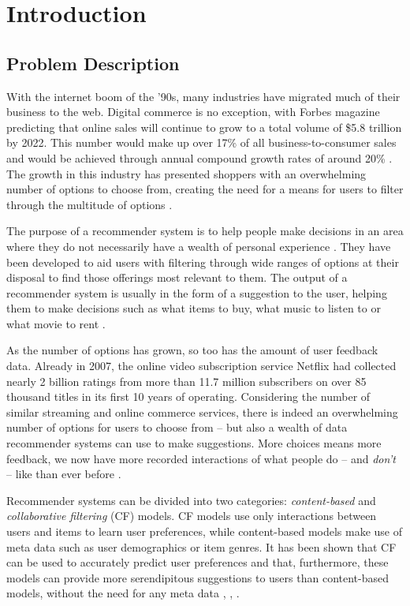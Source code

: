 \chapter{Introduction}

\label{intro} %

\section{Problem Description}
With the internet boom of the '90s, many industries have migrated much of their business to the web. Digital commerce is no exception, with Forbes magazine predicting that online sales will continue to grow to a total volume of \$5.8 trillion by 2022. This number would make up over 17\% of all business-to-consumer sales and would be achieved through annual compound growth rates of around 20\% \parencite{forbes2018growth}. The growth in this industry has presented shoppers with an overwhelming number of options to choose from, creating the need for a means for users to filter through the multitude of options \parencite{handbook_1.1_intro}.

The purpose of a  recommender system is to help people make decisions in an area where they do not necessarily have a wealth of personal experience \parencite{rs_1.1_Resnick}. They have been developed to aid users with filtering through wide ranges of options at their disposal to find those offerings most relevant to them. The output of a recommender system is usually in the form of a suggestion to the user, helping them to make decisions such as what items to buy, what music to listen to or what movie to rent \parencite{handbook_1.1_intro}.

As the number of options has grown, so too has the amount of user feedback data. Already in 2007, the online video subscription service Netflix had collected nearly 2 billion ratings from more than 11.7 million subscribers on over 85 thousand titles in its first 10 years of operating. Considering the number of similar streaming and online commerce services, there is indeed an overwhelming number of options for users to choose from -- but also a wealth of data recommender systems can use to make suggestions.
More choices means more feedback, we now have more recorded interactions of what people do -- and \textit{don't} -- like than ever before \parencite{netflix_description}.

Recommender systems can be divided into two categories: \textit{content-based} and \textit{collaborative filtering} (CF) models. CF models use only interactions between users and items to learn user preferences, while content-based models make use of meta data such as user demographics or item genres. It has been shown that CF can be used to accurately predict user preferences and that, furthermore, these models can provide more serendipitous suggestions to users than content-based models, without the need for any meta data \parencite{handbook_1.5_cf}, \parencite{handbook_1.3_content-based}, \parencite{handbook_1.8_evaluation}. 

